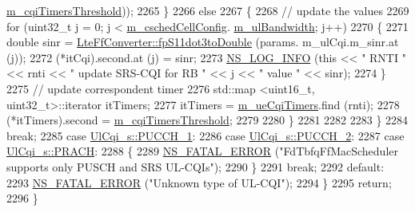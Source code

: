 \begin{DoxyCode}
      \hyperlink{classns3_1_1FdTbfqFfMacScheduler_a5699ce6b376d8919bd386101b5c55e4a}{m\_cqiTimersThreshold}));
2265           \}
2266         \textcolor{keywordflow}{else}
2267           \{
2268             \textcolor{comment}{// update the values}
2269             \textcolor{keywordflow}{for} (uint32\_t j = 0; j < \hyperlink{classns3_1_1FdTbfqFfMacScheduler_a73d5d866713fa06e1cc6186b0f556693}{m\_cschedCellConfig}.
      \hyperlink{structns3_1_1FfMacCschedSapProvider_1_1CschedCellConfigReqParameters_a5ab5b102878e6e7e7727a14af4a64d2f}{m\_ulBandwidth}; j++)
2270               \{
2271                 \textcolor{keywordtype}{double} sinr = \hyperlink{classns3_1_1LteFfConverter_aa5d8c2a8f988dbd63da91818c18666eb}{LteFfConverter::fpS11dot3toDouble} (params.
      m\_ulCqi.m\_sinr.at (j));
2272                 (*itCqi).second.at (j) = sinr;
2273                 \hyperlink{group__logging_gafbd73ee2cf9f26b319f49086d8e860fb}{NS\_LOG\_INFO} (\textcolor{keyword}{this} << \textcolor{stringliteral}{" RNTI "} << rnti << \textcolor{stringliteral}{" update SRS-CQI for RB  "} << j << \textcolor{stringliteral}{"
       value "} << sinr);
2274               \}
2275             \textcolor{comment}{// update correspondent timer}
2276             std::map <uint16\_t, uint32\_t>::iterator itTimers;
2277             itTimers = \hyperlink{classns3_1_1FdTbfqFfMacScheduler_a86890d454debae559e2a13f86c0b829c}{m\_ueCqiTimers}.find (rnti);
2278             (*itTimers).second = \hyperlink{classns3_1_1FdTbfqFfMacScheduler_a5699ce6b376d8919bd386101b5c55e4a}{m\_cqiTimersThreshold};
2279 
2280           \}
2281 
2282 
2283       \}
2284       \textcolor{keywordflow}{break};
2285     \textcolor{keywordflow}{case} \hyperlink{structns3_1_1UlCqi__s_aece9e5ebea42eb9ff1744c72c8459b57a05ca6554bc6fcd96a0a51fbaa8e794c7}{UlCqi\_s::PUCCH\_1}:
2286     \textcolor{keywordflow}{case} \hyperlink{structns3_1_1UlCqi__s_aece9e5ebea42eb9ff1744c72c8459b57a35664b4bda6f1cd6acfe9edc84c7571d}{UlCqi\_s::PUCCH\_2}:
2287     \textcolor{keywordflow}{case} \hyperlink{structns3_1_1UlCqi__s_aece9e5ebea42eb9ff1744c72c8459b57af93f36792cb1eed08f6119e4abfe58e8}{UlCqi\_s::PRACH}:
2288       \{
2289         \hyperlink{group__fatal_ga5131d5e3f75d7d4cbfd706ac456fdc85}{NS\_FATAL\_ERROR} (\textcolor{stringliteral}{"FdTbfqFfMacScheduler supports only PUSCH and SRS UL-CQIs"});
2290       \}
2291       \textcolor{keywordflow}{break};
2292     \textcolor{keywordflow}{default}:
2293       \hyperlink{group__fatal_ga5131d5e3f75d7d4cbfd706ac456fdc85}{NS\_FATAL\_ERROR} (\textcolor{stringliteral}{"Unknown type of UL-CQI"});
2294     \}
2295   \textcolor{keywordflow}{return};
2296 \}
\end{DoxyCode}


